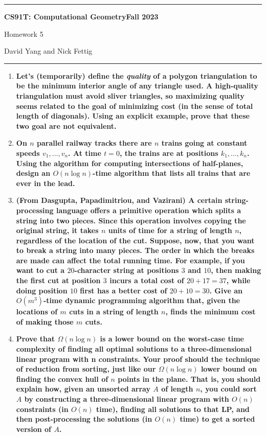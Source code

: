\documentclass[11pt]{article}
\begin{document}
\hrule
\begin{center}
    \textbf{CS91T: Computational Geometry}\hfill \textbf{Fall 2023}\newline

    {\Large Homework 5}

    David Yang and Nick Fettig
\end{center}

\hrule

\vspace{1em}

\begin{enumerate}
   \item \textbf{Let's (temporarily) define the \textit{quality} of a polygon triangulation to be the minimum interior
   angle of any triangle used. A high-quality triangulation must avoid sliver triangles, so maximizing quality seems related to the goal of minimizing cost (in the sense of total length of
   diagonals). Using an explicit example, prove that these two goal are not equivalent.}

   \item \textbf{On $n$ parallel railway tracks there are $n$ trains going at constant speeds $v_1, \dots, v_n$. At time
   $t = 0$, the trains are at positions $k_1, \dots, k_n$. Using the algorithm for computing intersections of half-planes, design an 
   $O(n \log n)$-time algorithm that lists all trains that are ever in the lead.}

   \item \textbf{(From Dasgupta, Papadimitriou, and Vazirani) A certain string-processing language offers a
   primitive operation which splits a string into two pieces. Since this operation involves copying
   the original string, it takes $n$ units of time for a string of length $n$, regardless of the location
   of the cut. Suppose, now, that you want to break a string into many pieces. The order in
   which the breaks are made can affect the total running time. For example, if you want to cut
   a $20$-character string at positions $3$ and $10$, then making the first cut at position $3$ incurs a
   total cost of $20 + 17 = 37$, while doing position $10$ first has a better cost of $20 + 10 = 30$.
   Give an $O(m^3)$-time dynamic programming algorithm that, given the locations of $m$ cuts in
   a string of length $n$, finds the minimum cost of making those $m$ cuts.}

   \item \textbf{Prove that $\Omega(n \log n)$  is a lower bound on the worst-case time complexity of finding all optimal
   solutions to a three-dimensional linear program with n constraints.
   Your proof should the technique of reduction from sorting, just like our $\Omega(n \log n)$ lower bound
   on finding the convex hull of $n$ points in the plane. That is, you should explain how, given
   an unsorted array $A$ of length $n$, you could sort $A$ by constructing a three-dimensional linear
   program with $O(n)$ constraints (in $O(n)$ time), finding all solutions to that LP, and then
   post-processing the solutions (in $O(n)$ time) to get a sorted version of $A$.}
\end{enumerate}
\end{document}
